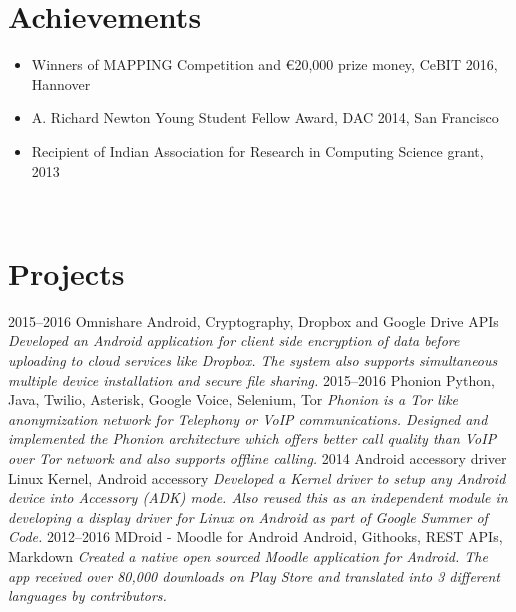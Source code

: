 \documentclass[]{friggeri-cv}
\begin{document}
\section{Achievements}
\begin{itemize}
  \item Winners of MAPPING Competition and \euro 20,000 prize money, CeBIT 2016, Hannover
  \item A. Richard Newton Young Student Fellow Award, DAC 2014, San Francisco
  \item Recipient of Indian Association for Research in Computing Science grant, 2013
\end{itemize}
~

\section{Projects}
\begin{entrylist}
  \entry
    {2015–2016}
    {Omnishare}
    {Android, Cryptography, Dropbox and Google Drive APIs}
    {\emph{Developed an Android application for client side encryption of data before uploading to cloud services like Dropbox. The system also supports simultaneous multiple device installation and secure file sharing.}}
  \entry
    {2015–2016}
    {Phonion}
    {Python, Java, Twilio, Asterisk, Google Voice, Selenium, Tor}
    {\emph{Phonion is a Tor like anonymization network for Telephony or VoIP communications. Designed and implemented the Phonion architecture which offers better call quality than VoIP over Tor network and also supports offline calling.}}
  \entry
    {2014}
    {Android accessory driver}
    {Linux Kernel, Android accessory}
    {\emph{Developed a Kernel driver to setup any Android device into Accessory (ADK) mode. Also reused this as an independent module in developing a display driver for Linux on Android as part of Google Summer of Code.}}
  \entry
    {2012–2016}
    {MDroid - Moodle for Android}
    {Android, Githooks, REST APIs, Markdown}
    {\emph{Created a native open sourced Moodle application for Android. The app received over 80,000 downloads on Play Store and translated into 3 different languages by contributors.}}
\end{entrylist}
\end{document}

